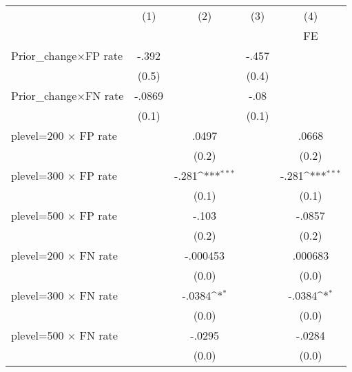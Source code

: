 {
\def\sym#1{\ifmmode^{#1}\else\(^{#1}\)\fi}
\begin{tabular}{l*{4}{c}}
\hline\hline
                &\multicolumn{1}{c}{(1)}&\multicolumn{1}{c}{(2)}&\multicolumn{1}{c}{(3)}&\multicolumn{1}{c}{(4)}\\
                &\multicolumn{1}{c}{}&\multicolumn{1}{c}{}&\multicolumn{1}{c}{}&\multicolumn{1}{c}{FE}\\
\hline
Prior\_change$\times$FP rate&    -.392         &                  &    -.457         &                  \\
                &    (0.5)         &                  &    (0.4)         &                  \\
Prior\_change$\times$FN rate&   -.0869         &                  &     -.08         &                  \\
                &    (0.1)         &                  &    (0.1)         &                  \\
plevel=200 $\times$ FP rate&                  &    .0497         &                  &    .0668         \\
                &                  &    (0.2)         &                  &    (0.2)         \\
plevel=300 $\times$ FP rate&                  &    -.281\sym{***}&                  &    -.281\sym{***}\\
                &                  &    (0.1)         &                  &    (0.1)         \\
plevel=500 $\times$ FP rate&                  &    -.103         &                  &   -.0857         \\
                &                  &    (0.2)         &                  &    (0.2)         \\
plevel=200 $\times$ FN rate&                  & -.000453         &                  &  .000683         \\
                &                  &    (0.0)         &                  &    (0.0)         \\
plevel=300 $\times$ FN rate&                  &   -.0384\sym{*}  &                  &   -.0384\sym{*}  \\
                &                  &    (0.0)         &                  &    (0.0)         \\
plevel=500 $\times$ FN rate&                  &   -.0295         &                  &   -.0284         \\
                &                  &    (0.0)         &                  &    (0.0)         \\

\end{tabular}}
